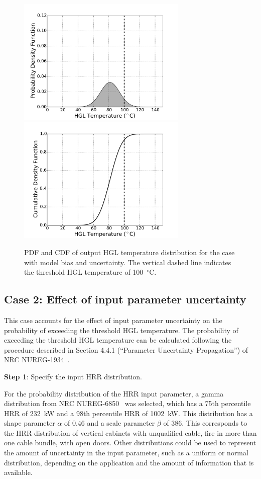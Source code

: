 \documentclass[12pt]{article}
\begin{document}
\begin{figure}[p]
\includegraphics[width=3.2in]{Figures/output_PDF_1_model}
\includegraphics[width=3.2in]{Figures/output_CDF_1_model}
\caption{PDF and CDF of output HGL temperature distribution for the case with model bias and uncertainty. The vertical dashed line indicates the threshold HGL temperature of 100~$^\circ$C.}
\label{fig:case_1_output_distributions}
\end{figure}


\clearpage


\subsection{Case 2: Effect of input parameter uncertainty}

This case accounts for the effect of input parameter uncertainty on the probability of exceeding the threshold HGL temperature. The probability of exceeding the threshold HGL temperature can be calculated following the procedure described in Section 4.4.1 (``Parameter Uncertainty Propagation'') of NRC NUREG-1934~\cite{NUREG_1934}.

\textbf{Step 1}: Specify the input HRR distribution.

For the probability distribution of the HRR input parameter, a gamma distribution from NRC NUREG-6850~\cite{NUREG_6850} was selected, which has a 75th percentile HRR of 232~kW and a 98th percentile HRR of 1002~kW. This distribution has a shape parameter $\alpha$ of 0.46 and a scale parameter $\beta$ of 386. This corresponds to the HRR distribution of vertical cabinets with unqualified cable, fire in more than one cable bundle, with open doors. Other distributions could be used to represent the amount of uncertainty in the input parameter, such as a uniform or normal distribution, depending on the application and the amount of information that is available.
\end{document}
